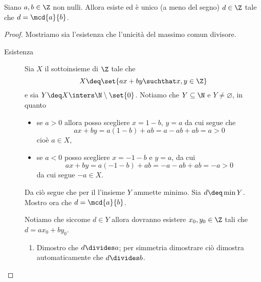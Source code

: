 \begin{theorem}
    Siano $a, b \in \Z$ non nulli. Allora esiste ed è unico (a meno del segno) $d \in \Z$ tale che $d = \mcd{a}{b}$.
\end{theorem}
\begin{proof}
    Mostriamo sia l'esistenza che l'unicità del massimo comun divisore.
    \begin{description}
        \item[Esistenza] Sia $X$ il sottoinsieme di $\Z$ tale che \[
            X \deq \set{ax + by \suchthat x, y \in \Z}    
        \] e sia $Y \deq X \inters \N \setminus \set{0}$. Notiamo che $Y \subseteq \N$ e $Y \neq \varnothing$, in quanto \begin{itemize}
            \item se $a > 0$ allora posso scegliere $x = 1 - b$, $y = a$ da cui segue che \[
                ax + by = a(1-b)+ab = a - ab + ab = a > 0
            \] cioè $a \in X$,
            \item se $a < 0$ posso scegliere $x = - 1 - b$ e $y = a$, da cui \[
                ax + by = a(-1-b)+ab = -a - ab + ab = -a > 0 
            \] da cui segue $-a \in X$.
        \end{itemize}

        Da ciò segue che per il  l'insieme $Y$ ammette minimo. Sia $d \deq \min Y$. Mostro ora che $d = \mcd{a}{b}$.

        Notiamo che siccome $d \in Y$ allora dovranno esistere $x_0, y_0 \in \Z$ tali che $d = ax_0 + by_0$.
        \begin{enumerate}[label={(\roman*)}]
            \item Dimostro che $d \divides a$; per simmetria dimostrare ciò dimostra automaticamente che $d \divides b$.
            

\end{enumerate}
\end{description}
\end{proof}

